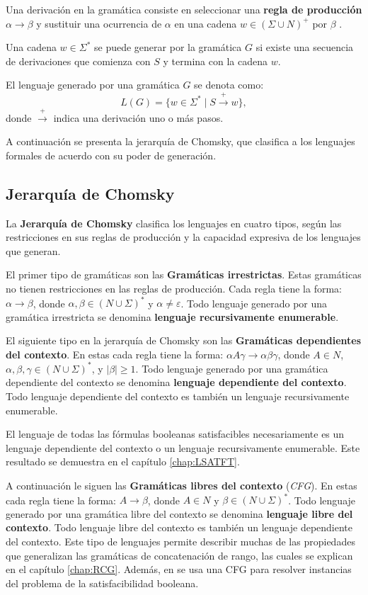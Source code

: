 Una derivación en la gramática consiste en seleccionar una \textbf{regla de producción} $\alpha \to \beta$ y sustituir una ocurrencia de
$\alpha$ en una cadena $w\in (\Sigma \cup N)^+$ por $\beta$ \cite{authomataTheory}.

Una cadena $w\in\Sigma^*$  se puede generar por la gramática $G$ si existe una secuencia de derivaciones que comienza con $S$
y termina con la cadena $w$.

El lenguaje generado por una gramática \(G\) se denota como:
\[
  L(G) = \{ w \in \Sigma^* \mid S \overset{+}{\to} w \},
\]
donde \(\overset{+}{\to}\) indica una derivación uno o más pasos.

A continuación se presenta la jerarquía de Chomsky, que clasifica a los lenguajes formales de acuerdo con su poder de generación.

\subsection{Jerarquía de Chomsky}

La \textbf{Jerarquía de Chomsky} \cite{hunter2020chomsky} clasifica los lenguajes en cuatro tipos, según las restricciones en sus reglas de 
producción y la capacidad expresiva de los lenguajes que generan.

El primer tipo de gramáticas son las \textbf{Gramáticas irrestrictas}. Estas gramáticas no tienen restricciones en las reglas de producción.
Cada regla tiene la forma: \(\alpha \to \beta\), donde \(\alpha, \beta \in (N \cup \Sigma)^*\) y \(\alpha \neq \varepsilon\).
Todo lenguaje generado por una gramática irrestricta se denomina \textbf{lenguaje recursivamente enumerable}. 

El siguiente tipo en la jerarquía de Chomsky son las \textbf{Gramáticas dependientes del contexto}. En estas cada regla tiene la forma: \(\alpha A \gamma \to \alpha \beta \gamma\), donde \(A \in N\), \(\alpha, \beta, \gamma \in (N \cup \Sigma)^*\), y \(|\beta| \geq 1\).
Todo lenguaje generado por una gramática dependiente del contexto se denomina \textbf{lenguaje dependiente del contexto}.
Todo lenguaje dependiente del contexto es también un lenguaje recursivamente enumerable. 

El lenguaje de todas las fórmulas booleanas satisfacibles necesariamente es un lenguaje dependiente del contexto o un lenguaje
recursivamente enumerable. Este resultado se demuestra en el capítulo \ref{chap:LSATFT}.

A continuación le siguen las \textbf{Gramáticas libres del contexto} (\textit{CFG}). En estas cada regla tiene la forma: \(A \to \beta\), donde \(A \in N\) y \(\beta \in (N \cup \Sigma)^*\).
Todo lenguaje generado por una gramática libre del contexto se denomina \textbf{lenguaje libre del contexto}.
Todo lenguaje libre del contexto es también un lenguaje dependiente del contexto. Este tipo de lenguajes permite describir 
muchas de las propiedades que generalizan las gramáticas de concatenación de rango, las cuales se explican en el capítulo
\ref{chap:RCG}. Además, en \cite{aCFSAT} se usa una CFG para resolver instancias del problema de la satisfacibilidad booleana.

